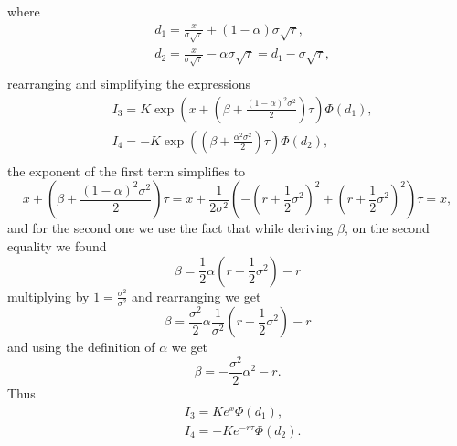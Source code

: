 where
\begin{equation*}
\begin{aligned}
    & d_1 = \frac{x}{\sigma \sqrt{\tau}} + (1 - \alpha) \sigma \sqrt{\tau}, \\
    & d_2 = \frac{x}{\sigma \sqrt{\tau}} - \alpha \sigma \sqrt{\tau} = d_1 - \sigma \sqrt{\tau}, \\
\end{aligned}
\end{equation*}
rearranging and simplifying the expressions
\begin{equation*}
\begin{aligned}
    & I_3 = K \exp \left( x + \left( \beta + \frac{(1 - \alpha)^2 \sigma^2}{2} \right) \tau \right) \Phi(d_1), \\
    & I_4 = - K \exp \left( \left( \beta + \frac{\alpha^2 \sigma^2}{2} \right) \tau \right) \Phi(d_2), \\
\end{aligned}
\end{equation*}
the exponent of the first term simplifies to
\begin{equation*}
    x + \left( \beta + \frac{(1 - \alpha)^2 \sigma^2}{2} \right) \tau
        = x + \frac{1}{2 \sigma^2} \left( - \left( r + \frac{1}{2} \sigma^2 \right)^2 + \left(r + \frac{1}{2}\sigma^2\right)^2 \right) \tau
        = x,
\end{equation*}
and for the second one we use the fact that while deriving $\beta$,
on the second equality we found
\begin{equation*}
    \beta 
        = \frac{1}{2} \alpha \left( r - \frac{1}{2} \sigma^2 \right) - r
\end{equation*}
multiplying by $1 = \frac{\sigma^2}{\sigma^2}$ and rearranging we get
\begin{equation*}
    \beta 
        = \frac{\sigma^2}{2} \alpha \frac{1}{\sigma^2}\left( r - \frac{1}{2} \sigma^2 \right) - r
\end{equation*}
and using the definition of $\alpha$ we get
\begin{equation*}
    \beta 
        = - \frac{\sigma^2}{2} \alpha^2 - r.
\end{equation*}
Thus
\begin{equation*}
\begin{aligned}
    & I_3 = K e^x \Phi(d_1), \\
    & I_4 = - K e^{-r \tau} \Phi(d_2). \\
\end{aligned}
\end{equation*}

